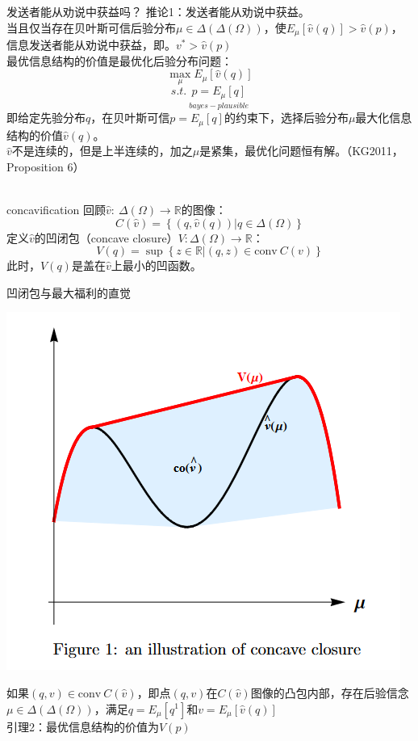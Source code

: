 \documentclass{beamer}
\begin{document}
\begin{frame}{发送者能从劝说中获益吗？}
	推论1：发送者能从劝说中获益。\\
	当且仅当存在贝叶斯可信后验分布$\mu\in\Delta\left(\Delta\left( \Omega\right)\right) $，使$E_{\mu} \left[\hat{v}\left(q\right)\right]>\hat{v}\left(p\right)$，信息发送者能从劝说中获益，即。$ v^{*}>\hat{v}\left(p\right) $\\
	最优信息结构的价值是最优化后验分布问题：
	$$\max_{\mu} E_{\mu} \left[\hat{v}\left(q\right)\right]$$
	$$s.t.\  \underset{bayes-plausible}{p=E_{\mu} \left[q\right]}$$
	即给定先验分布$q$，在贝叶斯可信$ p=E_{\mu} \left[q\right] $的约束下，选择后验分布$ \mu $最大化信息结构的价值$\hat{v}\left(q\right) $。\\
	$\hat{v}$不是连续的，但是上半连续的，加之$\mu$是紧集，最优化问题恒有解。（KG2011，Proposition 6）\\~\\

\end{frame}

\begin{frame}{concavification}
	回顾$\hat{v}:\ \Delta\left(\Omega \right)  \to  \mathbb{R}$的图像：
	$$C\left(\hat{v}\right) = \left\lbrace \left(q,\hat{v}\left(q\right)\right) | q\in \Delta\left(\Omega\right)  \right\rbrace$$
	定义$\hat{v}$的凹闭包（concave closure）$V:\Delta\left(\Omega \right)  \to  \mathbb{R}$：
	$$V\left(q\right) = \sup \left\lbrace z\in \mathbb{R} | \left(q,z\right)\in \text{conv} \ C\left(v\right) \right\rbrace$$
	此时，$V\left(q\right)$是盖在$\hat{v}$上最小的凹函数。
\end{frame}
\begin{frame}{凹闭包与最大福利的直觉}
	\begin{center}
		\includegraphics[width=0.5\linewidth]{pic/fig1.png}
	\end{center}
	如果$\left(q,v\right) \in \text{conv}\ C\left(\hat{v}\right)$，即点$\left(q,v\right)$在$C\left(\hat{v}\right)$图像的凸包内部，存在后验信念$\mu \in \Delta\left(\Delta \left(\Omega \right)\right)$，满足$q=E_{\mu}\left[q^{1}\right]$和$v=E_{\mu}\left[\hat{v}\left(q\right)\right]$\\
		引理2：最优信息结构的价值为$V\left(p\right)$
\end{frame}
\end{document}
